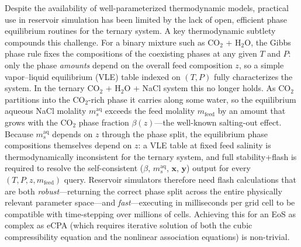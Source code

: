 \documentclass[preprint,12pt,authoryear]{elsarticle}
\begin{document}
Despite the availability of well-parameterized thermodynamic models, practical use in reservoir
simulation has been limited by the lack of open, efficient phase equilibrium routines for the
ternary system.
A key thermodynamic subtlety compounds this challenge.
For a binary mixture such as CO$_2$ + H$_2$O, the Gibbs phase rule fixes the compositions of
the coexisting phases at any given $T$ and $P$: only the phase \emph{amounts} depend on the
overall feed composition $z$, so a simple vapor--liquid equilibrium (VLE) table indexed on
$(T, P)$ fully characterizes the system.
In the ternary CO$_2$ + H$_2$O + NaCl system this no longer holds.
As CO$_2$ partitions into the CO$_2$-rich phase it carries along some water, so the
equilibrium aqueous NaCl molality $m_s^\mathrm{aq}$ exceeds the feed molality $m_\mathrm{feed}$
by an amount that grows with the CO$_2$ phase fraction $\beta(z)$---the well-known
salting-out effect.
Because $m_s^\mathrm{aq}$ depends on $z$ through the phase split, the equilibrium
phase compositions themselves depend on $z$: a VLE table at fixed feed salinity is
thermodynamically inconsistent for the ternary system, and full stability+flash is
required to resolve the self-consistent ($\beta$, $m_s^\mathrm{aq}$, $\mathbf{x}$, $\mathbf{y}$) output for
every $(T, P, z, m_\mathrm{feed})$ query.
Reservoir simulators therefore need flash calculations that are both \emph{robust}---returning the correct
phase split across the entire physically relevant parameter space---and \emph{fast}---executing
in milliseconds per grid cell to be compatible with time-stepping over millions of cells.
Achieving this for an EoS as complex as eCPA (which requires iterative solution of both the
cubic compressibility equation and the nonlinear association equations) is non-trivial.
\end{document}
